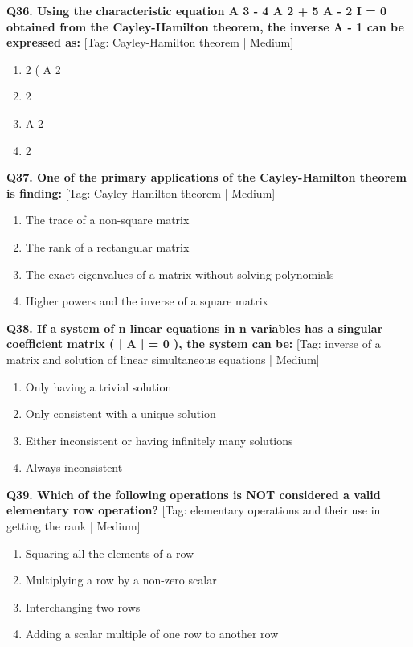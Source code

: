 \noindent\textbf{Q36. Using the characteristic equation A 3 - 4 A 2 + 5 A - 2 I = 0 obtained from the Cayley-Hamilton theorem, the inverse A - 1 can be expressed as:} \hfill [Tag: Cayley-Hamilton theorem | Medium]
\begin{enumerate}[label=(\alph*),topsep=2pt,itemsep=1pt,partopsep=0pt,parsep=0pt]
    \item {{2 ( A 2}}
    \item {{2}}
    \item {{A 2}}
    \item {{2}}
\end{enumerate}
\vspace{2mm}

\noindent\textbf{Q37. One of the primary applications of the Cayley-Hamilton theorem is finding:} \hfill [Tag: Cayley-Hamilton theorem | Medium]
\begin{enumerate}[label=(\alph*),topsep=2pt,itemsep=1pt,partopsep=0pt,parsep=0pt]
    \item {{The trace of a non-square matrix}}
    \item {{The rank of a rectangular matrix}}
    \item {{The exact eigenvalues of a matrix without solving polynomials}}
    \item {{Higher powers and the inverse of a square matrix}}
\end{enumerate}
\vspace{2mm}

\noindent\textbf{Q38. If a system of n linear equations in n variables has a singular coefficient matrix ( | A | = 0 ), the system can be:} \hfill [Tag: inverse of a matrix and solution of linear simultaneous equations | Medium]
\begin{enumerate}[label=(\alph*),topsep=2pt,itemsep=1pt,partopsep=0pt,parsep=0pt]
    \item {{Only having a trivial solution}}
    \item {{Only consistent with a unique solution}}
    \item {{Either inconsistent or having infinitely many solutions}}
    \item {{Always inconsistent}}
\end{enumerate}
\vspace{2mm}

\noindent\textbf{Q39. Which of the following operations is NOT considered a valid elementary row operation?} \hfill [Tag: elementary operations and their use in getting the rank | Medium]
\begin{enumerate}[label=(\alph*),topsep=2pt,itemsep=1pt,partopsep=0pt,parsep=0pt]
    \item {{Squaring all the elements of a row}}
    \item {{Multiplying a row by a non-zero scalar}}
    \item {{Interchanging two rows}}
    \item {{Adding a scalar multiple of one row to another row}}
\end{enumerate}
\vspace{2mm}


